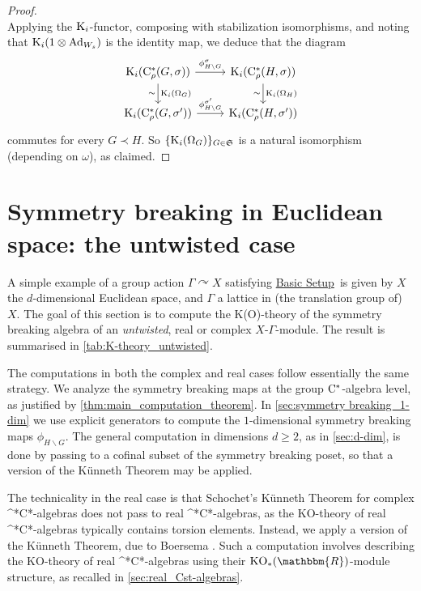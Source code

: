 \documentclass{amsart}
\numberwithin{figure}{section}
\numberwithin{equation}{section}
\numberwithin{table}{section}
\theoremstyle{plain}
\theoremstyle{definition}
\theoremstyle{remark}
\theoremstyle{nonumber}
\newcommand{\refbasicsetup}{\hyperref[basic_setup]{Basic Setup}}
\newcommand{\R}{\mathbb{R}}
\newcommand{\K}{\relax\ifmmode\operatorname{K}\else\textup{K}\fi}
\newcommand{\KO}{\relax\ifmmode\operatorname{KO}\else\textup{KO}\fi}
\newcommand{\Cst}{\relax\ifmmode\mathrm{C}^*\else\textup{C*}\fi}
\newcommand{\Cstr}{\Cst_\rho} %
\newcommand{\Ad}{\operatorname{Ad}} %
\renewcommand{\mathbb}{\mathbbm} %
\begin{document}
\begin{proof}
\begin{equation*}
\end{equation*}
Applying the $\K_i$-functor, composing with stabilization isomorphisms, and
noting that $\K_i(1\otimes\Ad_{W_s})$ is the identity map, we deduce that the diagram
\begin{equation}\label{eq:cohomologous_symm_breaking}
\begin{tikzcd}
\K_i(\Cstr(G,\sigma))\ar[r,"\phi_{H\backslash G}^\sigma"]\ar[d,"\K_i(\Omega_G)","\sim"'] & \K_i(\Cstr(H,\sigma))\ar[d,"\K_i(\Omega_H)","\sim"']\\
\K_i(\Cstr(G,\sigma^\prime))\ar[r,"\phi_{H\backslash G}^{\sigma^\prime}"] & \K_i(\Cstr(H,\sigma^\prime))
\end{tikzcd}
\end{equation}
commutes for every \( G\prec H \).
So $\{\K_i(\Omega_G)\}_{G\in\mathfrak{S}}$ is a natural isomorphism (depending on $\omega$), as claimed.
\end{proof}

\section{Symmetry breaking in Euclidean space: the untwisted case}
\label{sec:Euclidean_untwisted}
A simple example of a group action \( \Gamma\curvearrowright X \)
satisfying \refbasicsetup\, is given by
 \( X \) the \( d
\)-dimensional Euclidean space, and \( \Gamma \) a lattice in ({the translation group of)} \( X \).
The goal of this section is to compute the K(O)-theory of
the symmetry breaking algebra of an \emph{untwisted}, real or complex \( X
\)-\( \Gamma \)-module. The result is summarised in
\cref{tab:K-theory_untwisted}.

The computations in both the complex and real cases follow essentially the
same strategy. We analyze the symmetry breaking maps at the group
$\Cst$-algebra level, as justified by \cref{thm:main_computation_theorem}.
In \cref{sec:symmetry breaking_1-dim} we use explicit generators to compute
the \( 1 \)-dimensional symmetry breaking maps \( \phi_{H\backslash G} \).
The general computation in dimensions \( d\geq 2 \), as in
\cref{sec:d-dim}, is done by passing to a cofinal subset of the symmetry
breaking poset, so that a version of the K\"unneth Theorem may be applied.

The technicality in the real case is that Schochet's K\"unneth Theorem for
complex \Cst-algebras \cite{Schochet:Kuenneth_formula} does not pass to
real \Cst-algebras, as the KO-theory of real \Cst-algebras typically
contains torsion elements. Instead, we apply a version of the K\"unneth Theorem, due
to Boersema \cite{Boersema:Real_Cst-algebras_Kuenneth_formula}. Such a
computation involves describing the KO-theory of real \Cst-algebras using
their \( \KO_*(\R) \)-module structure, as recalled in
\cref{sec:real_Cst-algebras}.
\end{document}
